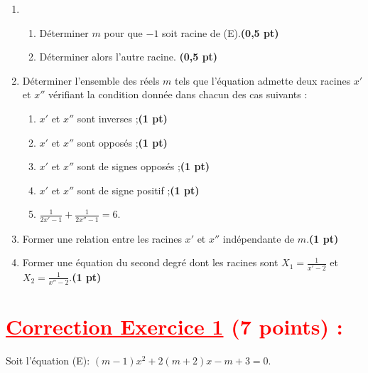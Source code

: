\documentclass[12pt]{article}
\begin{document}
\begin{enumerate}
    \item 
    \begin{enumerate}
        \item Déterminer \(m\) pour que \(-1\) soit racine de (E).\textbf{(0,5 pt)}
        
        \item Déterminer alors l’autre racine. \textbf{(0,5 pt)}
    \end{enumerate}

    \item Déterminer l’ensemble des réels \(m\) tels que l’équation admette deux racines \(x'\) et \(x''\) vérifiant la condition donnée dans chacun des cas suivants :
    \begin{enumerate}
        \item \(x'\) et \(x''\) sont inverses ;\textbf{(1 pt)}
        
        \item \(x'\) et \(x''\) sont opposés ;\textbf{(1 pt)}
        
        \item \(x'\) et \(x''\) sont de signes opposés ;\textbf{(1 pt)}
        
        \item \(x'\) et \(x''\) sont de signe positif ;\textbf{(1 pt)}
        
        \item \(\frac{1}{2x'-1} + \frac{1}{2x''-1} = 6\).
    \end{enumerate}

    \item Former une relation entre les racines \(x'\) et \(x''\) indépendante de \(m\).\textbf{(1 pt)}

    \item Former une équation du second degré dont les racines sont \(X_1 = \frac{1}{x' - 2}\) et \(X_2 = \frac{1}{x'' - 2}\).\textbf{(1 pt)}
\end{enumerate}
\section*{\textcolor{red}{\underline{Correction Exercice 1} (7 points) :}}
Soit l’équation (E): $(m -1)x^2 + 2(m + 2)x - m + 3 = 0$.
\end{document}
